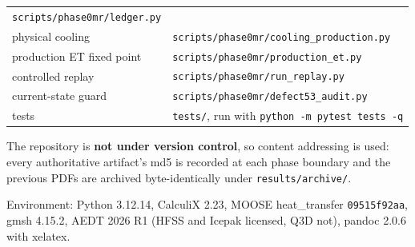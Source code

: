\documentclass[10pt,]{article}
\begin{document}
\begin{longtable}[]{@{}ll@{}}
\begin{minipage}[t]{0.47\columnwidth}
\texttt{scripts/phase0mr/ledger.py}\strut
\end{minipage}\tabularnewline
\begin{minipage}[t]{0.47\columnwidth}\raggedright
physical cooling\strut
\end{minipage} & \begin{minipage}[t]{0.47\columnwidth}\raggedright
\texttt{scripts/phase0mr/cooling\_production.py}\strut
\end{minipage}\tabularnewline
\begin{minipage}[t]{0.47\columnwidth}\raggedright
production ET fixed point\strut
\end{minipage} & \begin{minipage}[t]{0.47\columnwidth}\raggedright
\texttt{scripts/phase0mr/production\_et.py}\strut
\end{minipage}\tabularnewline
\begin{minipage}[t]{0.47\columnwidth}\raggedright
controlled replay\strut
\end{minipage} & \begin{minipage}[t]{0.47\columnwidth}\raggedright
\texttt{scripts/phase0mr/run\_replay.py}\strut
\end{minipage}\tabularnewline
\begin{minipage}[t]{0.47\columnwidth}\raggedright
current-state guard\strut
\end{minipage} & \begin{minipage}[t]{0.47\columnwidth}\raggedright
\texttt{scripts/phase0mr/defect53\_audit.py}\strut
\end{minipage}\tabularnewline
\begin{minipage}[t]{0.47\columnwidth}\raggedright
tests\strut
\end{minipage} & \begin{minipage}[t]{0.47\columnwidth}\raggedright
\texttt{tests/}, run with \texttt{python\ -m\ pytest\ tests\ -q}\strut
\end{minipage}\tabularnewline
\bottomrule
\end{longtable}

The repository is \textbf{not under version control}, so content
addressing is used: every authoritative artifact's md5 is recorded at
each phase boundary and the previous PDFs are archived byte-identically
under \texttt{results/archive/}.

Environment: Python 3.12.14, CalculiX 2.23, MOOSE heat\_transfer
\texttt{09515f92aa}, gmsh 4.15.2, AEDT 2026 R1 (HFSS and Icepak
licensed, Q3D not), pandoc 2.0.6 with xelatex.
\end{document}
